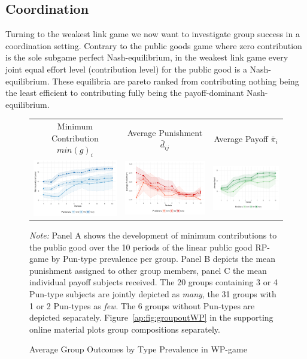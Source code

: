 \documentclass[11pt,a4paper]{article}
\begin{document}
\begin{refsection}
\subsection{Coordination}

Turning to the weakest link game we now want to investigate group success in a
coordination setting. Contrary to the public goods game where zero contribution
is the sole subgame perfect Nash-equilibrium, in the weakest link game every
joint equal effort level (contribution level) for the public good is a
Nash-equilibrium. These equilibria are pareto ranked from contributing nothing being
the least efficient to contributing fully being the payoff-dominant
Nash-equilibrium.


\begin{figure}[tbp]
  \centering
  \begin{tabular}{|c|c|c|}
    \hline
    Minimum Contribution $min({g})_i$ &
        Average Punishment $\bar{d}_{ij}$ & 
            Average Payoff $\bar{\pi}_i$\\
    [.3em]
    \includegraphics[width=.3\linewidth]{img/71_minimum} &
        \includegraphics[width=.3\linewidth]{img/71_pun} &
            \includegraphics[width=.3\linewidth]{img/71_payoff}\\
    \hline
  \end{tabular}
  \caption{Average Group Outcomes by Type Prevalence in WP-game}
  \label{fig:groupoutWP}
  \smallskip
  \parbox{\linewidth}{\footnotesize\textit{Note:} Panel A shows the development
    of minimum contributions to the public good over the 10 periods of the linear
    public good RP-game by Pun-type prevalence per group. Panel B depicts the
    mean punishment assigned to other group members, panel C the mean individual
  payoff subjects received. The 20 groups containing 3 or 4 Pun-type subjects
  are jointly depicted as \emph{many}, the 31 groups with 1 or 2 Pun-types as
  \emph{few}. The 6 groups without Pun-types are depicted separately.
  Figure~\ref{ap:fig:groupoutWP} in the supporting online material plots
  group compositions separately.}
\end{figure}
 

\end{refsection}
\end{document}
